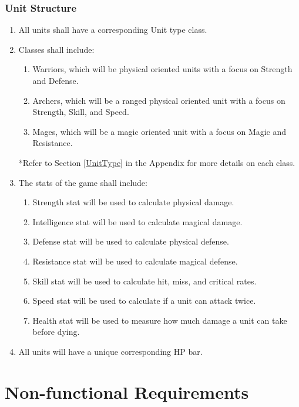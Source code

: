 \documentclass{article}
\begin{document}
\subsubsection{Unit Structure} \label{unitStructure}

\begin{enumerate}[resume]
    \item All units shall have a corresponding Unit type class. 
    \item Classes shall include:
    \begin{enumerate}
        \item Warriors, which will be physical oriented units with a focus on Strength and Defense.
        \item Archers, which will be a ranged physical oriented unit with a focus on Strength, Skill, and Speed.
        \item Mages, which will be a magic oriented unit with a focus on Magic and Resistance.
    \end{enumerate}
    *Refer to Section \ref{UnitType} in the Appendix for more details on each class.
    \item The stats of the game shall include:
    \begin{enumerate}
        \item Strength stat will be used to calculate physical damage.
        \item Intelligence stat will be used to calculate magical damage.
        \item Defense stat will be used to calculate physical defense.
        \item Resistance stat will be used to calculate magical defense.
        \item Skill stat will be used to calculate hit, miss, and critical rates.
        \item Speed stat will be used to calculate if a unit can attack twice.
        \item Health stat will be used to measure how much damage a unit can take before dying.
    \end{enumerate}
    \item All units will have a unique corresponding HP bar.
\end{enumerate}

\section{Non-functional Requirements}
\end{document}
